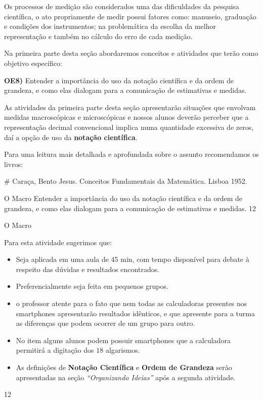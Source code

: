 \cleardoublepage
\def\currentcolor{session1}
\begin{texto}
{
Os processos de medição são considerados uma das dificuldades da pesquisa científica, o ato propriamente de medir possui fatores como: manuseio, graduação e condições dos instrumentos; na problemática da escolha da melhor representação e também no cálculo do erro de cada medição.

Na primeira parte desta seção abordaremos conceitos e atividades que terão como objetivo específico:

\textbf{OE8)} Entender a importância do uso da notação científica e da ordem de grandeza, e como elas dialogam para a comunicação de estimativas e medidas.

As atividades da primeira parte desta seção apresentarão situações que envolvam medidas macroscópicas e microscópicas e nossos alunos deverão perceber que a representação decimal convencional implica numa quantidade excessiva de zeros, daí a opção de uso da \textbf{notação científica}.

Para uma leitura mais detalhada e aprofundada sobre o assunto recomendamos os livros:

\# Caraça, Bento Jesus. Conceitos Fundamentais da Matemática. Lisboa 1952.
}
\end{texto}
\clearmargin
\begin{objectives}{O Macro}
{
Entender a importância do uso da notação científica e da ordem de grandeza, e como elas dialogam para a comunicação de estimativas e medidas.
}{1}{2}
\end{objectives}
\begin{sugestions}{O Macro}
{
Para esta atividade sugerimos que:
\begin{itemize}
\item {} 
Seja aplicada em uma aula de 45 min, com tempo disponível para debate à respeito das dúvidas e resultados encontrados.

\item {} 
Preferencialmente seja feita em pequenos grupos.

\item {} 
o professor atente para o fato que nem todas as calculadoras presentes nos smartphones apresentarão resultados idênticos, e que apresente para a turma as diferenças que podem ocorrer de um grupo para outro.

\item {} 
No item  alguns alunos podem possuir smartphones que a calculadora permitirá a digitação dos \(18\) algarismos.

\item {} 
As definições de \textbf{Notação Científica} e \textbf{Ordem de Grandeza} serão apresentadas na seção \textit{“Organizando Ideias”} após a segunda atividade.
\end{itemize}
}{1}{2}
\end{sugestions}

